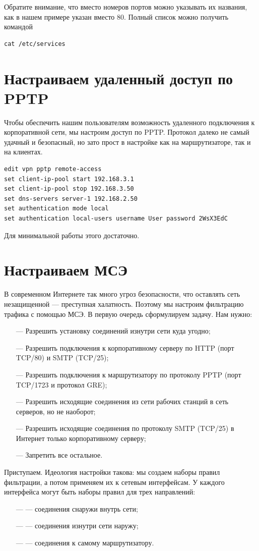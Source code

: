 \documentclass[a4paper,12pt, twoside, russian]{report}
\begin{document}
Обратите внимание, что вместо номеров портов можно указывать их названия, как в нашем примере указан 
 вместо 80. Полный список можно получить командой 
\begin{verbatim}
cat /etc/services
\end{verbatim}

\section{Настраиваем удаленный доступ по PPTP}
Чтобы обеспечить нашим пользователям возможность удаленного подключения к корпоративной сети, мы настроим
доступ по PPTP. Протокол далеко не самый удачный и безопасный, но зато прост в настройке как на маршрутизаторе,
так и на клиентах.
\begin{verbatim}
edit vpn pptp remote-access
set client-ip-pool start 192.168.3.1
set client-ip-pool stop 192.168.3.50
set dns-servers server-1 192.168.2.50
set authentication mode local
set authentication local-users username User password 2WsX3EdC
\end{verbatim}
Для минимальной работы этого достаточно. 

\section{Настраиваем МСЭ}
В современном Интернете так много угроз безопасности, что оставлять сеть незащищенной --- преступная халатность.
Поэтому мы настроим фильтрацию трафика с помощью МСЭ. В первую очередь сформулируем задачу. Нам нужно:
\begin{itemize}
 \item[---] Разрешить установку соединений изнутри сети куда угодно;
 \item[---] Разрешить подключения к корпоративному серверу по HTTP (порт TCP/80) и SMTP (TCP/25);
 \item[---] Разрешить подключения к маршрутизатору по протоколу PPTP (порт TCP/1723 и протокол GRE);
 \item[---] Разрешить исходящие соединения из сети рабочих станций в сеть серверов, но не наоборот;
 \item[---] Разрешить исходящие соединения по протоколу SMTP (TCP/25) в Интернет только корпоративному серверу;
 \item[---] Запретить все остальное.
\end{itemize}

Приступаем. Идеология настройки такова: мы создаем наборы правил фильтрации, а потом применяем их к
сетевым интерфейсам. У каждого интерфейса могут быть наборы правил для трех направлений:
\begin{itemize}
 \item[---]  --- соединения снаружи внутрь сети;
 \item[---]  --- соединения изнутри сети наружу;
 \item[---]  --- соединения к самому маршрутизатору.
\end{itemize}
\end{document}
